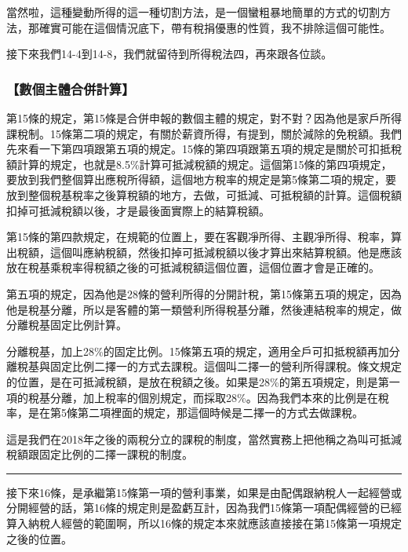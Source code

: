 \documentclass[oneside,sub3section]{ctexbook}
\begin{document}
當然啦，這種變動所得的這一種切割方法，是一個蠻粗暴地簡單的方式的切割方法，那確實可能在這個情況底下，帶有稅捐優惠的性質，我不排除這個可能性。

接下來我們14-4到14-8，我們就留待到所得稅法四，再來跟各位談。

\hypertarget{ux6578ux500bux4e3bux9ad4ux5408ux4f75ux8a08ux7b97}{%
\subsubsection{【數個主體合併計算】}\label{ux6578ux500bux4e3bux9ad4ux5408ux4f75ux8a08ux7b97}}

第15條的規定，第15條是合併申報的數個主體的規定，對不對？因為他是家戶所得課稅制。15條第二項的規定，有關於薪資所得，有提到，關於減除的免稅額。我們先來看一下第四項跟第五項的規定。15條的第四項跟第五項的規定是關於可扣抵稅額計算的規定，也就是8.5\%計算可抵減稅額的規定。這個第15條的第四項規定，要放到我們整個算出應稅所得額，這個地方稅率的規定是第5條第二項的規定，要放到整個稅基稅率之後算稅額的地方，去做，可抵減、可抵稅額的計算。這個稅額扣掉可抵減稅額以後，才是最後面實際上的結算稅額。

第15條的第四款規定，在規範的位置上，要在客觀凈所得、主觀凈所得、稅率，算出稅額，這個叫應納稅額，然後扣掉可抵減稅額以後才算出來結算稅額。他是應該放在稅基乘稅率得稅額之後的可抵減稅額這個位置，這個位置才會是正確的。

第五項的規定，因為他是28條的營利所得的分開計稅，第15條第五項的規定，因為他是稅基分離，所以是客體的第一類營利所得稅基分離，然後連結稅率的規定，做分離稅基固定比例計算。

分離稅基，加上28\%的固定比例。15條第五項的規定，適用全戶可扣抵稅額再加分離稅基與固定比例二擇一的方式去課稅。這個叫二擇一的營利所得課稅。條文規定的位置，是在可抵減稅額，是放在稅額之後。如果是28\%的第五項規定，則是第一項的稅基分離，加上稅率的個別規定，而採取28\%。因為我們本來的比例是在稅率，是在第5條第二項裡面的規定，那這個時候是二擇一的方式去做課稅。

這是我們在2018年之後的兩稅分立的課稅的制度，當然實務上把他稱之為叫可抵減稅額跟固定比例的二擇一課稅的制度。

\begin{center}\rule{0.5\linewidth}{0.5pt}\end{center}

接下來16條，是承繼第15條第一項的營利事業，如果是由配偶跟納稅人一起經營或分開經營的話，第16條的規定則是盈虧互計，因為我們15條第一項配偶經營的已經算入納稅人經營的範圍啊，所以16條的規定本來就應該直接接在第15條第一項規定之後的位置。
\end{document}
